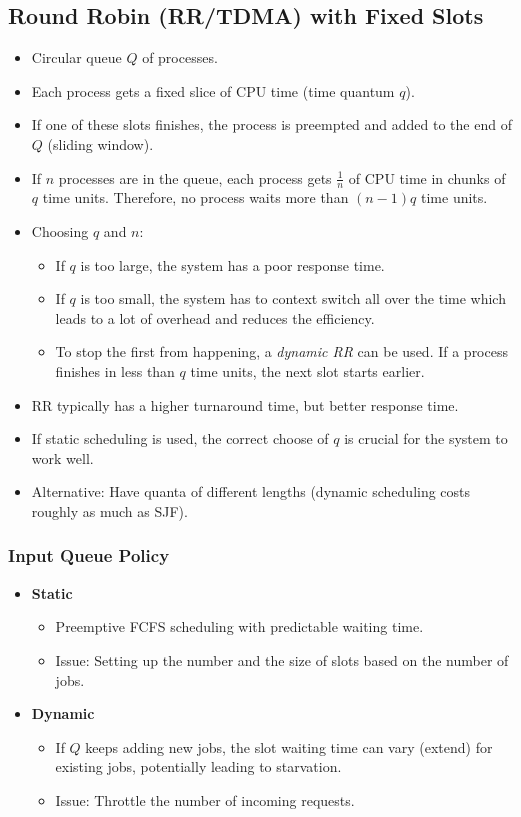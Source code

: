 		\subsection{Round Robin (RR/TDMA) with Fixed Slots}
			\begin{itemize}
				\item Circular queue \(Q\) of processes.
				\item Each process gets a fixed slice of CPU time (time quantum \(q\)).
				\item If one of these slots finishes, the process is preempted and added to the end of \(Q\) (sliding window).
				\item If \(n\) processes are in the queue, each process gets \( \frac{1}{n} \) of CPU time in chunks of \(q\) time units. Therefore, no process waits more than \( (n - 1)q \) time units.
				\item Choosing \(q\) and \(n\):
					\begin{itemize}
						\item If \(q\) is too large, the system has a poor response time.
						\item If \(q\) is too small, the system has to context switch all over the time which leads to a lot of overhead and reduces the efficiency.
						\item To stop the first from happening, a \textit{dynamic RR} can be used. If a process finishes in less than \(q\) time units, the next slot starts earlier.
					\end{itemize}
				\item RR typically has a higher turnaround time, but better response time.
				\item If static scheduling is used, the correct choose of \(q\) is crucial for the system to work well.
				\item Alternative: Have quanta of different lengths (dynamic scheduling costs roughly as much as SJF).
			\end{itemize}

			\subsubsection{Input Queue Policy}
				\begin{itemize}
					\item \textbf{Static}
						\begin{itemize}
							\item Preemptive FCFS scheduling with predictable waiting time.
							\item Issue: Setting up the number and the size of slots based on the number of jobs.
						\end{itemize}
					\item \textbf{Dynamic}
						\begin{itemize}
							\item If \(Q\) keeps adding new jobs, the slot waiting time can vary (extend) for existing jobs, potentially leading to starvation.
							\item Issue: Throttle the number of incoming requests.
						\end{itemize}
				\end{itemize}

